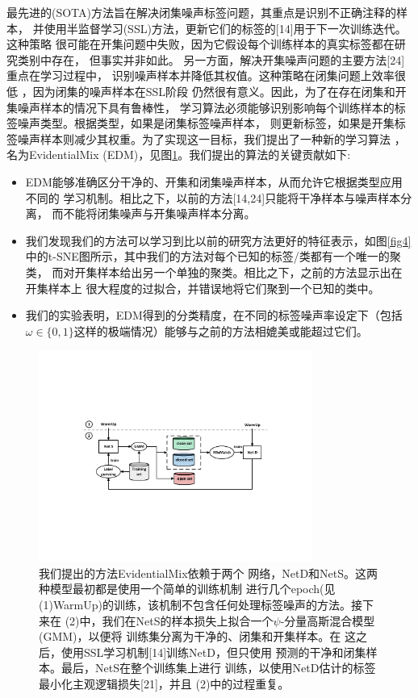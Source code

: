 \documentclass[11pt]{article}
\begin{document}
最先进的(SOTA)方法旨在解决闭集噪声标签问题，其重点是识别不正确注释的样本，
并使用半监督学习(SSL)方法，更新它们的标签的[14]用于下一次训练迭代。这种策略
很可能在开集问题中失败，因为它假设每个训练样本的真实标签都在研究类别中存在，
但事实并非如此。 另一方面，解决开集噪声问题的主要方法[24]重点在学习过程中，
识别噪声样本并降低其权值。这种策略在闭集问题上效率很低 ，因为闭集的噪声样本在SSL阶段
仍然很有意义。因此，为了在存在闭集和开集噪声样本的情况下具有鲁棒性，
学习算法必须能够识别影响每个训练样本的标签噪声类型。根据类型，如果是闭集标签噪声样本，
则更新标签，如果是开集标签噪声样本则减少其权重。为了实现这一目标，我们提出了一种新的学习算法 ，
名为EvidentialMix (EDM)，见图\ref{fig2}。我们提出的算法的关键贡献如下:
\begin{itemize}
    \item EDM能够准确区分干净的、开集和闭集噪声样本，从而允许它根据类型应用不同的
    学习机制。相比之下，以前的方法[14,24]只能将干净样本与噪声样本分离，
    而不能将闭集噪声与开集噪声样本分离。
    \item 我们发现我们的方法可以学习到比以前的研究方法更好的特征表示，如图\ref{fig4}
    中的t-SNE图所示，其中我们的方法对每个已知的标签/类都有一个唯一的聚类，
    而对开集样本给出另一个单独的聚类。相比之下，之前的方法显示出在开集样本上
    很大程度的过拟合，并错误地将它们聚到一个已知的类中。
    \item  我们的实验表明，EDM得到的分类精度，在不同的标签噪声率设定下（包括
    $\omega \in \{0,1\}$这样的极端情况）能够与之前的方法相媲美或能超过它们。
\end{itemize}
\begin{figure}[!htb]
    \centering
    \includegraphics[width=0.8\textwidth]{images/diagrams/EDM_diagram_color6.pdf}
    \caption{我们提出的方法EvidentialMix依赖于两个
    网络，NetD和NetS。这两种模型最初都是使用一个简单的训练机制
    进行几个epoch(见(1)WarmUp)的训练，该机制不包含任何处理标签噪声的方法。接下来在
    (2)中，我们在NetS的样本损失上拟合一个$\psi$-分量高斯混合模型(GMM)，以便将
    训练集分离为干净的、闭集和开集样本。在
    这之后，使用SSL学习机制[14]训练NetD，但只使用
    预测的干净和闭集样本。最后，NetS在整个训练集上进行
    训练，以使用NetD估计的标签最小化主观逻辑损失[21]，并且
    (2)中的过程重复。}
    \label{fig2}
\end{figure}
\end{document}
